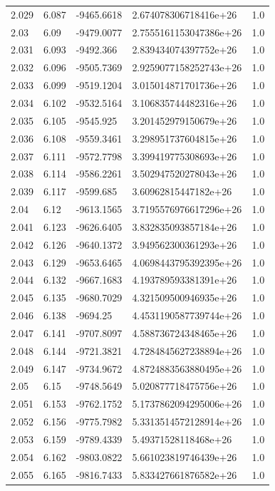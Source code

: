 \begin{tabular}{lllll}
2.029 & 6.087 & -9465.6618 & 2.674078306718416e+26 & 1.0 \\
2.03 & 6.09 & -9479.0077 & 2.7555161153047386e+26 & 1.0 \\
2.031 & 6.093 & -9492.366 & 2.839434074397752e+26 & 1.0 \\
2.032 & 6.096 & -9505.7369 & 2.9259077158252743e+26 & 1.0 \\
2.033 & 6.099 & -9519.1204 & 3.015014871701736e+26 & 1.0 \\
2.034 & 6.102 & -9532.5164 & 3.106835744482316e+26 & 1.0 \\
2.035 & 6.105 & -9545.925 & 3.201452979150679e+26 & 1.0 \\
2.036 & 6.108 & -9559.3461 & 3.298951737604815e+26 & 1.0 \\
2.037 & 6.111 & -9572.7798 & 3.399419775308693e+26 & 1.0 \\
2.038 & 6.114 & -9586.2261 & 3.502947520278043e+26 & 1.0 \\
2.039 & 6.117 & -9599.685 & 3.60962815447182e+26 & 1.0 \\
2.04 & 6.12 & -9613.1565 & 3.7195576976617296e+26 & 1.0 \\
2.041 & 6.123 & -9626.6405 & 3.832835093857184e+26 & 1.0 \\
2.042 & 6.126 & -9640.1372 & 3.949562300361293e+26 & 1.0 \\
2.043 & 6.129 & -9653.6465 & 4.0698443795392395e+26 & 1.0 \\
2.044 & 6.132 & -9667.1683 & 4.193789593381391e+26 & 1.0 \\
2.045 & 6.135 & -9680.7029 & 4.321509500946935e+26 & 1.0 \\
2.046 & 6.138 & -9694.25 & 4.4531190587739744e+26 & 1.0 \\
2.047 & 6.141 & -9707.8097 & 4.588736724348465e+26 & 1.0 \\
2.048 & 6.144 & -9721.3821 & 4.7284845627238894e+26 & 1.0 \\
2.049 & 6.147 & -9734.9672 & 4.8724883563880495e+26 & 1.0 \\
2.05 & 6.15 & -9748.5649 & 5.020877718475756e+26 & 1.0 \\
2.051 & 6.153 & -9762.1752 & 5.1737862094295006e+26 & 1.0 \\
2.052 & 6.156 & -9775.7982 & 5.3313514572128914e+26 & 1.0 \\
2.053 & 6.159 & -9789.4339 & 5.49371528118468e+26 & 1.0 \\
2.054 & 6.162 & -9803.0822 & 5.661023819746439e+26 & 1.0 \\
2.055 & 6.165 & -9816.7433 & 5.833427661876582e+26 & 1.0 \\

\end{tabular}
